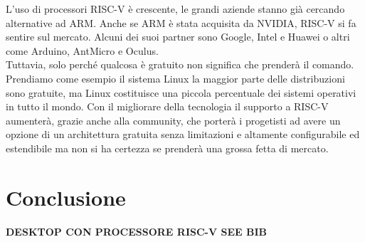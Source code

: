 \documentclass[12pt,a4paper]{report}
\begin{document}
L’uso di processori RISC-V è crescente,  le grandi aziende stanno già cercando alternative ad ARM. Anche se ARM è stata acquisita da  NVIDIA,  RISC-V si fa sentire sul mercato. Alcuni dei suoi partner sono Google, Intel e Huawei o altri come Arduino, AntMicro e Oculus.  \\

Tuttavia, solo perché qualcosa è gratuito non significa che prenderà il comando. Prendiamo come esempio il sistema Linux la maggior parte delle distribuzioni sono gratuite, ma Linux costituisce una piccola percentuale dei sistemi operativi in tutto il mondo.   Con il migliorare della tecnologia il supporto a RISC-V aumenterà, grazie anche alla community, che porterà i progetisti ad avere un opzione di un architettura gratuita senza limitazioni e altamente configurabile ed estendibile ma non si ha certezza se prenderà una grossa fetta di mercato.

\chapter{Conclusione}
\textbf{DESKTOP CON PROCESSORE RISC-V SEE BIB}

\printbibliography
\end{document}
